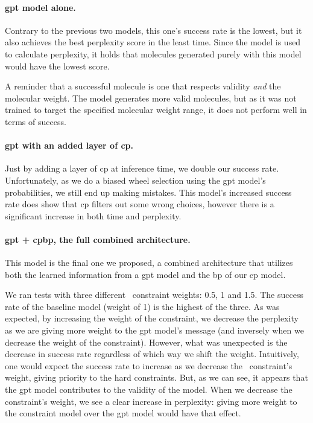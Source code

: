 \documentclass[../Document.tex]{subfiles}
\begin{document}
\paragraph{\gls{gpt} model alone.}
Contrary to the previous two models, this one's success rate is the lowest, but it also achieves the best perplexity score in the least time.
Since the model is used to calculate perplexity, it holds that molecules generated purely with this model would have the lowest score.

A reminder that a successful molecule is one that respects validity \emph{and} the molecular weight. The model generates more valid molecules, but as it was not trained to target the specified molecular weight range, it does not perform well in terms of success.

\paragraph{\gls{gpt} with an added layer of \gls{cp}.}
Just by adding a layer of \gls{cp} at inference time, we double our success rate.
Unfortunately, as we do a biased wheel selection using the \gls{gpt} model's probabilities, we still end up making mistakes.
This model's increased success rate does show that \gls{cp} filters out some wrong choices, however there is a significant increase in both time and perplexity.

\paragraph{\gls{gpt} + \gls{cpbp}, the full combined architecture.}
This model is the final one we proposed, a combined architecture that utilizes both the learned information from a \gls{gpt} model and the \gls{bp} of our \gls{cp} model.

We ran tests with three different \oracle\ constraint weights: 0.5, 1 and 1.5.
The success rate of the baseline model (weight of 1) is the highest of the three. 
As was expected, by increasing the weight of the constraint, we decrease the perplexity as we are giving more weight to the \gls{gpt} model's message (and inversely when we decrease the weight of the constraint).
However, what was unexpected is the decrease in success rate regardless of which way we shift the weight.
Intuitively, one would expect the success rate to increase as we decrease the \oracle\ constraint's weight, giving priority to the hard constraints.
But, as we can see, it appears that the \gls{gpt} model contributes to the validity of the model.
When we decrease the constraint's weight, we see a clear increase in perplexity: giving more weight to the constraint model over the \gls{gpt} model would have that effect.
\end{document}
